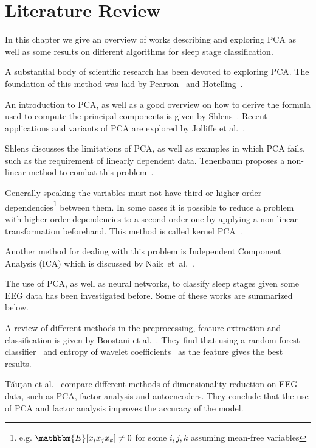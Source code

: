 \chapter{Literature Review}
\label{chapter:study_of_literature}

In this chapter we give an overview of works describing and exploring PCA as well as some results on different algorithms for sleep stage classification.

A substantial body of scientific research has been devoted to exploring PCA.
The foundation of this method was laid by Pearson~\cite{Pearson1901} and Hotelling~\cite{Hotelling1933}.

An introduction to PCA, as well as a good overview on how to derive the formula used to compute the principal components is given by Shlens~\cite{Shlens2014}.
Recent applications and variants of PCA are explored by Jolliffe et al.~\cite{Jolliffe2016}.

Shlens discusses the limitations of PCA, as well as examples in which PCA fails, such as the requirement of linearly dependent data.
Tenenbaum proposes a non-linear method to combat this problem~\cite{Tenenbaum2000}.

Generally speaking the variables must not have third or higher order dependencies\footnote{e.g. $\mathbbm{E}[x_ix_jx_k] \neq 0$ for some $i, j, k$ assuming mean-free variables} between them. In some cases it is possible to reduce a problem with higher order dependencies to a second order one by applying a non-linear transformation beforehand. This method is called kernel PCA~\cite{Scholkopf1997}.

Another method for dealing with this problem is Independent Component Analysis (ICA) which is discussed by Naik~et~al.~\cite{Naik2011}.

The use of PCA, as well as neural networks, to classify sleep stages given some EEG data has been investigated before. Some of these works are summarized below.

A review of different methods in the preprocessing, feature extraction and classification is given by Boostani et al.~\cite{Boostani2017}. They find that using a random forest classifier~\cite{Breiman2001} and entropy of wavelet coefficients~\cite{Chui1994} as the feature gives the best results.

Tăuţan et al.~\cite{Tautan2021} compare different methods of dimensionality reduction on EEG data, such as PCA, factor analysis and autoencoders. They conclude that the use of PCA and factor analysis improves the accuracy of the model.

